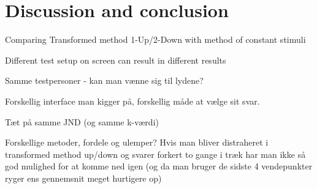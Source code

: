\section*{Discussion and conclusion}
Comparing Transformed method 1-Up/2-Down with method of constant stimuli



Different test setup on screen can result in different results

Samme testpersoner - kan man vænne sig til lydene?

Forskellig interface man kigger på, forskellig måde at vælge sit svar. 

Tæt på samme JND (og samme k-værdi)

Forskellige metoder, fordele og ulemper? Hvis man bliver distraheret i transformed method up/down og svarer forkert to gange i træk har man ikke så god mulighed for at komme ned igen (og da man bruger de sidste 4 vendepunkter ryger ens gennemsnit meget hurtigere op)

